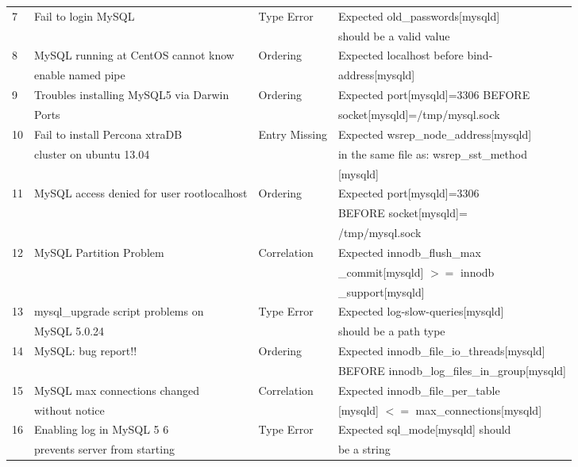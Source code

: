 \begin{table*}[t]
\begin{small}
\begin{tabular}{|l|l|l|l|}
7 & Fail to login MySQL
& Type Error
& Expected old\_passwords[mysqld] 
 \\ &&&  should be a valid value \\ \hline

8 & MySQL running at CentOS cannot know 
& Ordering
& Expected localhost before bind-
 \\ & enable named pipe
&&  address[mysqld] \\ \hline

9 & Troubles installing MySQL5 via  Darwin 
& Ordering
& Expected port[mysqld]=3306 BEFORE \\ & Ports
&&  socket[mysqld]=/tmp/mysql.sock \\ \hline

10 & Fail to install Percona xtraDB 
& Entry Missing
& Expected wsrep\_node\_address[mysqld] \\ & cluster on ubuntu 13.04
&&  in the same file as: wsrep\_sst\_method \\ &&& [mysqld] \\ \hline

11 & MySQL access denied for user rootlocalhost 
& Ordering
& Expected port[mysqld]=3306  \\ & &&   BEFORE socket[mysqld]= \\ &&& /tmp/mysql.sock
\\ \hline

12 & MySQL Partition Problem
& Correlation
& Expected innodb\_flush\_max  \\ & &&  \_commit[mysqld] $>=$ innodb \\ &&&  \_support[mysqld] \\ \hline

13 & mysql\_upgrade script problems on 
& Type Error
& Expected log-slow-queries[mysqld]  \\ & MySQL 5.0.24 
&&  should be a path type\\ \hline


14 & MySQL: bug report!!
& Ordering
& Expected innodb\_file\_io\_threads[mysqld]  \\ & 
&& BEFORE innodb\_log\_files\_in\_group[mysqld]\\ \hline

15 & MySQL max connections changed 
& Correlation
& Expected innodb\_file\_per\_table \\ & without notice
&&  [mysqld] $<=$ max\_connections[mysqld]  \\ \hline

16 & Enabling log in MySQL 5 6 
& Type Error
& Expected sql\_mode[mysqld] should  \\ & prevents server from starting
&&  be a string \\ \hline


\end{tabular}
\end{small}
\end{table*}
